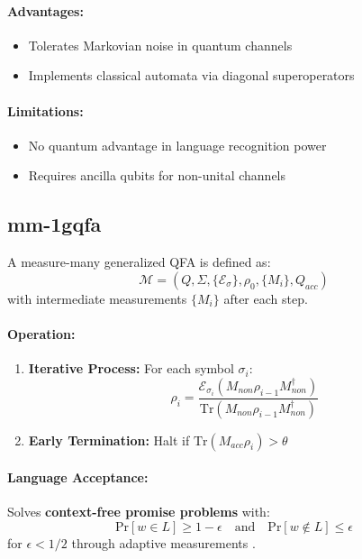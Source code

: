 \paragraph{Advantages:}
\begin{itemize}
    \item Tolerates Markovian noise in quantum channels
    \item Implements classical automata via diagonal superoperators
\end{itemize}

\paragraph{Limitations:}
\begin{itemize}
    \item No quantum advantage in language recognition power
    \item Requires ancilla qubits for non-unital channels
\end{itemize}

\subsection{\acrfull{mm-1gqfa}}
\label{subsec:mm-1gqfa}

\begin{definition}
A measure-many generalized QFA is defined as:
\[
\mathcal{M} = (Q, \Sigma, \{\mathcal{E}_\sigma\}, \rho_0, \{M_i\}, Q_{acc})
\]
with intermediate measurements $\{M_i\}$ after each step.
\end{definition}

\paragraph{Operation:}
\begin{enumerate}
    \item \textbf{Iterative Process:} For each symbol $\sigma_i$:
    \[
    \rho_i = \frac{\mathcal{E}_{\sigma_i}(M_{non}\rho_{i-1}M_{non}^\dagger)}{\text{Tr}(M_{non}\rho_{i-1}M_{non}^\dagger)}
    \]
    \item \textbf{Early Termination:} Halt if $\text{Tr}(M_{acc}\rho_i) > \theta$
\end{enumerate}

\paragraph{Language Acceptance:}
Solves \textbf{context-free promise problems} with:
\[
\text{Pr}[w \in L] \geq 1-\epsilon \quad \text{and} \quad \text{Pr}[w \notin L] \leq \epsilon
\]
for $\epsilon < 1/2$ through adaptive measurements \cite{hirvensalo2012quantum}.

